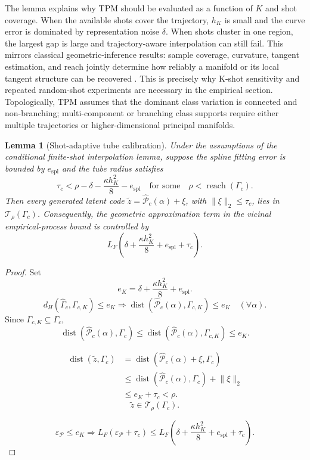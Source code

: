\documentclass[preprint,12pt,number]{elsarticle}
\newtheorem{lemma}{Lemma}
\begin{document}
The lemma explains why TPM should be evaluated as a function of $K$ and shot coverage. When the available shots cover the trajectory, $h_K$ is small and the curve error is dominated by representation noise $\delta$. When shots cluster in one region, the largest gap is large and trajectory-aware interpolation can still fail. This mirrors classical geometric-inference results: sample coverage, curvature, tangent estimation, and reach jointly determine how reliably a manifold or its local tangent structure can be recovered \citep{niyogi2008finding, genovese2012manifold, aamari2019nonasymptotic}. This is precisely why K-shot sensitivity and repeated random-shot experiments are necessary in the empirical section. Topologically, TPM assumes that the dominant class variation is connected and non-branching; multi-component or branching class supports require either multiple trajectories or higher-dimensional principal manifolds.

\begin{lemma}[Shot-adaptive tube calibration]
	Under the assumptions of the conditional finite-shot interpolation lemma, suppose the spline fitting error is bounded by $e_{\mathrm{spl}}$ and the tube radius satisfies
	\[
		\tau_c
		<
		\rho-\delta-\frac{\kappa h_K^2}{8}-e_{\mathrm{spl}}
		\quad\text{for some}\quad
		\rho<\operatorname{reach}(\Gamma_c).
	\]
	Then every generated latent code $\tilde z=\widehat{\mathcal{P}}_c(\alpha)+\xi$, with $\lVert\xi\rVert_2\le\tau_c$, lies in $\mathcal{T}_\rho(\Gamma_c)$. Consequently, the geometric approximation term in the vicinal empirical-process bound is controlled by
	\[
		L_F\left(\delta+\frac{\kappa h_K^2}{8}+e_{\mathrm{spl}}+\tau_c\right).
	\]
\end{lemma}

\begin{proof}
	Set
	\[
	e_K=\delta+\frac{\kappa h_K^2}{8}+e_{\mathrm{spl}}.
	\]
	\[
	d_H(\widehat{\Gamma}_c,\Gamma_{c,K})\le e_K
	\Longrightarrow
	\operatorname{dist}(\widehat{\mathcal{P}}_c(\alpha),\Gamma_{c,K})\le e_K
	\quad(\forall\alpha).
	\]
	Since $\Gamma_{c,K}\subseteq\Gamma_c$,
	\[
	\operatorname{dist}(\widehat{\mathcal{P}}_c(\alpha),\Gamma_c)
	\le
	\operatorname{dist}(\widehat{\mathcal{P}}_c(\alpha),\Gamma_{c,K})
	\le e_K .
	\]

	\[
	\begin{aligned}
	\operatorname{dist}(\tilde z,\Gamma_c)
	&=
	\operatorname{dist}(\widehat{\mathcal{P}}_c(\alpha)+\xi,\Gamma_c)\\
	&\le
	\operatorname{dist}(\widehat{\mathcal{P}}_c(\alpha),\Gamma_c)+\lVert\xi\rVert_2\\
	&\le
	e_K+\tau_c
	<
	\rho .
	\end{aligned}
	\]
	\[
	\tilde z\in\mathcal{T}_\rho(\Gamma_c).
	\]

	\[
	\varepsilon_{\mathcal{P}}\le e_K
	\Longrightarrow
	L_F(\varepsilon_{\mathcal{P}}+\tau_c)
	\le
	L_F\left(\delta+\frac{\kappa h_K^2}{8}+e_{\mathrm{spl}}+\tau_c\right).
	\]
\end{proof}
\end{document}
